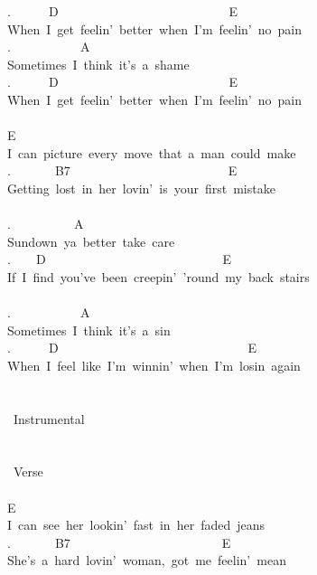 {.\ \ \ \ \ \ D\ \ \ \ \ \ \ \ \ \ \ \ \ \ \ \ \ \ \ \ \ \ \ \ \ \ \ E\\
When\ I\ get\ feelin'\ better\ when\ I'm\ feelin'\ no\ pain\\
.\ \ \ \ \ \ \ \ \ \ \ A\\
Sometimes\ I\ think\ it's\ a\ shame\\
.\ \ \ \ \ \ D\ \ \ \ \ \ \ \ \ \ \ \ \ \ \ \ \ \ \ \ \ \ \ \ \ \ \ E\\
When\ I\ get\ feelin'\ better\ when\ I'm\ feelin'\ no\ pain\\
\\
E\ \ \ \ \ \ \ \ \ \ \ \ \ \ \ \ \ \ \ \ \ \ \ \ \ \ \ \ \ \ \ \ \ \ \ \ \ \ \\
I\ can\ picture\ every\ move\ that\ a\ man\ could\ make\\
.\ \ \ \ \ \ \ B7\ \ \ \ \ \ \ \ \ \ \ \ \ \ \ \ \ \ \ \ \ \ \ \ \ E\\
Getting\ lost\ in\ her\ lovin'\ is\ your\ first\ mistake\\
\\
.\ \ \ \ \ \ \ \ \ \ A\\
Sundown\ ya\ better\ take\ care\\
.\ \ \ \ D\ \ \ \ \ \ \ \ \ \ \ \ \ \ \ \ \ \ \ \ \ \ \ \ \ \ \ \ E\\
If\ I\ find\ you've\ been\ creepin'\ 'round\ my\ back\ stairs\\
\\
.\ \ \ \ \ \ \ \ \ \ \ A\ \ \ \ \ \ \ \ \ \\
Sometimes\ I\ think\ it's\ a\ sin\\
.\ \ \ \ \ \ D\ \ \ \ \ \ \ \ \ \ \ \ \ \ \ \ \ \ \ \ \ \ \ \ \ \ \ \ \ \ E\\
When\ I\ feel\ like\ I'm\ winnin'\ when\ I'm\ losin\ again\\
\\
\\
\lbrack\ Instrumental\rbrack\\
\\
\\
\lbrack\ Verse\rbrack\\
\\
E\ \ \ \ \ \ \ \ \ \\
I\ can\ see\ her\ lookin'\ fast\ in\ her\ faded\ jeans\\
.\ \ \ \ \ \ \ B7\ \ \ \ \ \ \ \ \ \ \ \ \ \ \ \ \ \ \ \ \ \ \ \ E\\
She's\ a\ hard\ lovin'\ woman,\ got\ me\ feelin'\ mean\\
\\
}
